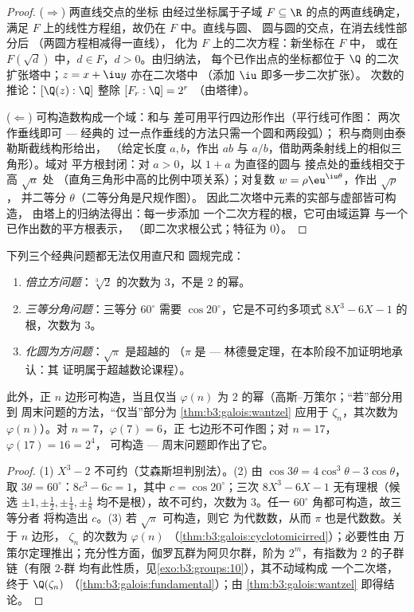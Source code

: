 \begin{proof}
($\Rightarrow$) 两直线交点的坐标
由经过坐标属于子域 $F \subseteq \R$ 的点的两直线确定，
满足 $F$ 上的线性方程组，故仍在 $F$ 中。直线与圆、
圆与圆的交点，在消去线性部分后
（两圆方程相减得一直线），
化为 $F$ 上的二次方程：新坐标在 $F$ 中，
或在 $F(\sqrt d)$ 中，$d \in F$，$d > 0$。由归纳法，
每个已作出点的坐标都位于
$\Q$ 的二次扩张塔中；$z = x + \iu y$ 亦在二次塔中
（添加 $\iu$ 即多一步二次扩张）。
次数的推论：$[\Q(z):\Q]$ 整除 $[F_r : \Q] = 2^r$
（由塔律）。

($\Leftarrow$) 可构造数构成一个域：和与
差可用平行四边形作出（平行线可作图：
两次作垂线即可 --- 经典的
过一点作垂线的方法只需一个圆和两段弧）；
积与商则由泰勒斯截线构形给出，
（给定长度 $a, b$，作出 $ab$ 与
$a/b$，借助两条射线上的相似三角形）。域对
平方根封闭：对 $a > 0$，以 $1 + a$ 为直径的圆与
接点处的垂线相交于高 $\sqrt a$ 处
（直角三角形中高的比例中项关系）；对复数
$w = \rho\eu^{\iu\theta}$，作出 $\sqrt\rho$，
并二等分 $\theta$（二等分角是尺规作图）。
因此二次塔中元素的实部与虚部皆可构造，
由塔上的归纳法得出：每一步添加
一个二次方程的根，它可由域运算
与一个已作出数的平方根表示，
（即二次求根公式；特征为 $0$）。
\end{proof}

\begin{corollary}\label{cor:b3:galois:impossible}
下列三个经典问题都无法仅用直尺和
圆规完成：
\begin{enumerate}
  \item \emph{倍立方问题}：$\sqrt[3]2$ 的次数为
        $3$，不是 $2$ 的幂。
  \item \emph{三等分角问题}：三等分 $60^\circ$
        需要 $\cos 20^\circ$，它是不可约多项式 $8X^3
        - 6X - 1$ 的根，次数为 $3$。
  \item \emph{化圆为方问题}：$\sqrt\pi$ 是超越的
        （$\pi$ 是 --- 林德曼定理，在本阶段不加证明地承认：其
        证明属于超越数论课程）。
\end{enumerate}
此外，正 $n$ 边形可构造，当且仅当
$\varphi(n)$ 为 $2$ 的幂（高斯–万策尔；“若”部分用到
周末问题的方法，“仅当”部分为
\cref{thm:b3:galois:wantzel} 应用于 $\zeta_n$，其次数为
$\varphi(n)$）。对 $n = 7$，$\varphi(7) = 6$，正
七边形不可作图；对 $n = 17$，$\varphi(17) = 16 = 2^4$，
可构造 --- 周末问题即作出了它。
\end{corollary}

\begin{proof}
(1) $X^3 - 2$ 不可约（艾森斯坦判别法）。(2) 由 $\cos
3\theta = 4\cos^3\theta - 3\cos\theta$，取 $3\theta =
60^\circ$：$8c^3 - 6c = 1$，其中 $c = \cos 20^\circ$；三次
$8X^3 - 6X - 1$ 无有理根（候选 $\pm1, \pm\frac
12, \pm\frac14, \pm\frac18$ 均不是根），故不可约，次数为
$3$。任一 $60^\circ$ 角都可构造，故三等分者
将构造出 $c$。(3) 若 $\sqrt\pi$ 可构造，则它
为代数数，从而 $\pi$ 也是代数数。关于 $n$ 边形，
$\zeta_n$ 的次数为 $\varphi(n)$
（\cref{thm:b3:galois:cyclotomicirred}）；必要性由
万策尔定理推出；充分性方面，伽罗瓦群为阿贝尔群，阶为
$2^m$，有指数为 $2$ 的子群链（有限 $2$-群
均有此性质，见\cref{exo:b3:groups:10}），其不动域构成
一个二次塔，终于 $\Q(\zeta_n)$
（\cref{thm:b3:galois:fundamental}）；由
\cref{thm:b3:galois:wantzel} 即得结论。
\end{proof}

